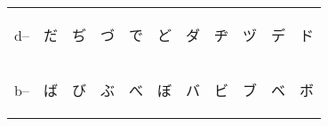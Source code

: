 \begin{table}[H]
\begin{tabular}{l|ccccc|ccccc}
        d-- & {\begin{CJK}{UTF8}{min} だ \end{CJK}} & {\begin{CJK}{UTF8}{min} ぢ \end{CJK}} & {\begin{CJK}{UTF8}{min} づ \end{CJK}} & {\begin{CJK}{UTF8}{min} で \end{CJK}} & {\begin{CJK}{UTF8}{min} ど \end{CJK}} & {\begin{CJK}{UTF8}{min} ダ \end{CJK}} & {\begin{CJK}{UTF8}{min} ヂ \end{CJK}} & {\begin{CJK}{UTF8}{min} ヅ \end{CJK}} & {\begin{CJK}{UTF8}{min} デ \end{CJK}} & {\begin{CJK}{UTF8}{min} ド \end{CJK}} \\
        b-- & {\begin{CJK}{UTF8}{min} ば \end{CJK}} & {\begin{CJK}{UTF8}{min} び \end{CJK}} & {\begin{CJK}{UTF8}{min} ぶ \end{CJK}} & {\begin{CJK}{UTF8}{min} べ \end{CJK}} & {\begin{CJK}{UTF8}{min} ぼ \end{CJK}} & {\begin{CJK}{UTF8}{min} バ \end{CJK}} & {\begin{CJK}{UTF8}{min} ビ \end{CJK}} & {\begin{CJK}{UTF8}{min} ブ \end{CJK}} & {\begin{CJK}{UTF8}{min} ベ \end{CJK}} & {\begin{CJK}{UTF8}{min} ボ \end{CJK}} \\

\end{tabular}
\end{table}
